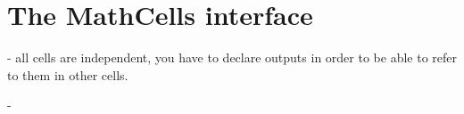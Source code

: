 
\section{The MathCells interface}

- all cells are independent, you have to declare outputs in order to
be able to refer to them in other cells.

- 
